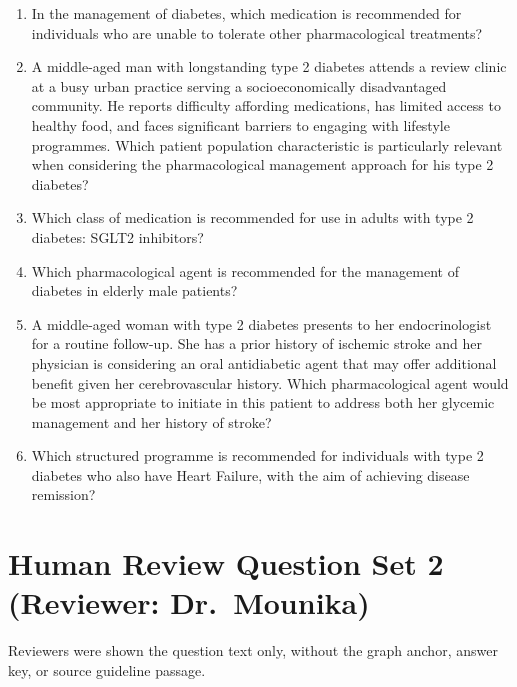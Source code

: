 \begin{enumerate}
\item In the management of diabetes, which medication is recommended for individuals who are unable to tolerate other pharmacological treatments?

\item A middle-aged man with longstanding type 2 diabetes attends a review clinic at a busy urban practice serving a socioeconomically disadvantaged community. He reports difficulty affording medications, has limited access to healthy food, and faces significant barriers to engaging with lifestyle programmes. Which patient population characteristic is particularly relevant when considering the pharmacological management approach for his type 2 diabetes?

\item Which class of medication is recommended for use in adults with type 2 diabetes: SGLT2 inhibitors?

\item Which pharmacological agent is recommended for the management of diabetes in elderly male patients?

\item A middle-aged woman with type 2 diabetes presents to her endocrinologist for a routine follow-up. She has a prior history of ischemic stroke and her physician is considering an oral antidiabetic agent that may offer additional benefit given her cerebrovascular history. Which pharmacological agent would be most appropriate to initiate in this patient to address both her glycemic management and her history of stroke?

\item Which structured programme is recommended for individuals with type 2 diabetes who also have Heart Failure, with the aim of achieving disease remission?

\end{enumerate}

\section{Human Review Question Set 2 (Reviewer: Dr.~Mounika)}
\label{app:review-set-2}

Reviewers were shown the question text only, without the graph anchor,
answer key, or source guideline passage.

